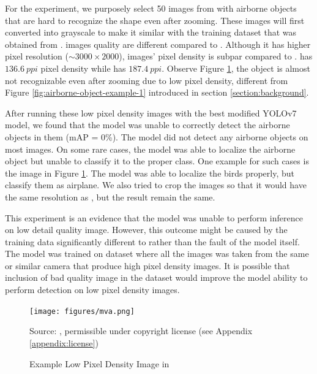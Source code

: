 For the experiment, we purposely select 50 images from \textcite{mva2023} with airborne objects that are hard to recognize the shape even after zooming.
These images will first converted into grayscale to make it similar with the training dataset that was obtained from \textcite{aot_dataset}.
\textcite{mva2023} images quality are different compared to \textcite{aot_dataset}.
Although it has higher pixel resolution ($\sim 3000\times 2000$), \textcite{mva2023} images' pixel density is subpar compared to \textcite{aot_dataset}.
\textcite{mva2023} has $136.6\ ppi$ pixel density while \textcite{aot_dataset} has $187.4\ ppi$.
Observe Figure \ref{fig:mva}, the object is almost not recognizable even after zooming due to low pixel density, different from Figure \ref{fig:airborne-object-example-1} introduced in section \ref{section:background}.

After running these low pixel density images with the best modified YOLOv7 model, we found that the model was unable to correctly detect the airborne objects in them (mAP = 0\%).
The model did not detect any airborne objects on most images. On some rare cases, the model was able to localize the airborne object but unable to classify it to the proper class.
One example for such cases is the image in Figure \ref{fig:mva}. The model was able to localize the birds properly, but classify them as airplane.
We also tried to crop the images so that it would have the same resolution as \textcite{aot_dataset}, but the result remain the same.

This experiment is an evidence that the model was unable to perform inference on low detail quality image.
However, this outcome might be caused by the training data significantly different to \textcite{mva2023} rather than the fault of the model itself.
The model was trained on dataset where all the images was taken from the same or similar camera that produce high pixel density images.
It is possible that inclusion of bad quality image in the dataset would improve the model ability to perform detection on low pixel density images.

\begin{figure}[btp]
  \centering
  \texttt{[image: figures/mva.png]}
  \caption*{Source: \textcite{mva2023}, permissible under copyright license (see Appendix \ref{appendix:license})}
  \caption{Example Low Pixel Density Image in \textcite{mva2023}}
  \label{fig:mva}
\end{figure}
